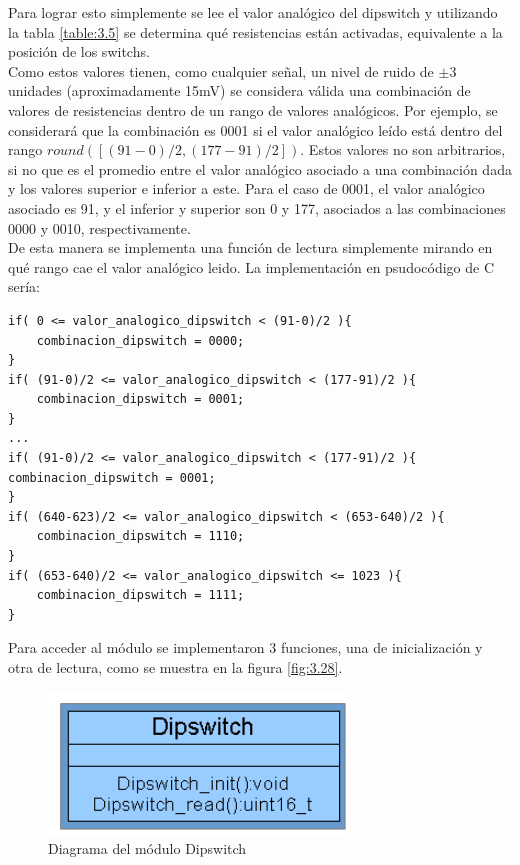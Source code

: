 Para lograr esto simplemente se lee el valor analógico del dipswitch y utilizando la tabla \ref{table:3.5} se determina qué resistencias están activadas, equivalente a la posición de los switchs. \\
Como estos valores tienen, como cualquier señal, un nivel de ruido de \(\pm\)3 unidades (aproximadamente 15mV) se considera válida una combinación de valores de resistencias dentro de un rango de valores analógicos. Por ejemplo, se considerará que la combinación es 0001 si el valor analógico leído está dentro del rango \(round([(91-0)/2,(177-91)/2])\). Estos valores no son arbitrarios, si no que es el promedio entre el valor analógico asociado a una combinación dada y los valores superior e inferior a este. Para el caso de 0001, el valor analógico asociado es 91, y el inferior y superior son 0 y 177, asociados a las combinaciones 0000 y 0010, respectivamente.\\
De esta manera se implementa una función de lectura simplemente mirando en qué rango cae el valor analógico leido. La implementación en psudocódigo de C sería:
\begin{lstlisting}[style=CStyle]
if( 0 <= valor_analogico_dipswitch < (91-0)/2 ){
	combinacion_dipswitch = 0000;
}
if( (91-0)/2 <= valor_analogico_dipswitch < (177-91)/2 ){
	combinacion_dipswitch = 0001;
}
...
if( (91-0)/2 <= valor_analogico_dipswitch < (177-91)/2 ){
combinacion_dipswitch = 0001;
}
if( (640-623)/2 <= valor_analogico_dipswitch < (653-640)/2 ){
	combinacion_dipswitch = 1110;
}
if( (653-640)/2 <= valor_analogico_dipswitch <= 1023 ){
	combinacion_dipswitch = 1111;
}
\end{lstlisting}

Para acceder al módulo se implementaron 3 funciones, una de inicialización y otra de lectura, como se muestra en la figura \ref{fig:3.28}.

\begin{figure}[!ht]
	\centering
	\includegraphics[width=8cm,scale=1]{resources/3_28-moduloDipswitch.png}
	\caption{Diagrama del módulo Dipswitch}
	\label{fig:\thefigure}
\end{figure}

